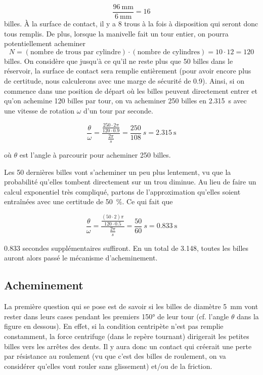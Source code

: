 \[\frac{\SI{96}{\milli\metre}}{\SI{6}{\milli\metre}} = \num{16}\]
billes. À la surface de contact, il y a \num{8} trous à la fois à disposition qui seront donc tous remplis. De plus, lorsque la manivelle fait un tour entier, on pourra potentiellement acheminer 
\[N = (\text{nombre de trous par cylindre}) \cdot (\text{nombre de cylindres}) = \num{10} \cdot \num{12} = \num{120}\]
billes.
On considère que jusqu'à ce qu'il ne reste plus que \num{50} billes dans le réservoir, la surface de contact sera remplie entièrement (pour avoir encore plus de certitude, nous calculerons avec une marge de sécurité de \num{0.9}).
Ainsi, si on commence dans une position de départ où les billes peuvent directement entrer et qu'on achemine \num{120} billes par tour, on va acheminer \num{250} billes en \SI{2.315}{\s} avec une vitesse de rotation $\omega$ d'un tour par seconde.

\[\frac{\theta}{\omega} = \frac{\frac{250 \cdot 2\pi}{120 \cdot 0.9}}{\frac{2\pi}{s}} = \frac{250}{108} \ s = \SI{2.315}{\s}\]

où $\theta$ est l'angle à parcourir pour acheminer 250 billes.

Les \num{50} dernières billes vont s'acheminer un peu plus lentement, vu que la probabilité qu'elles tombent directement sur un trou diminue. Au lieu de faire un calcul exponentiel très compliqué, partons de l'approximation qu'elles soient entraînées avec une certitude de \SI{50}{\percent}. Ce qui fait que

\[\frac{\theta}{\omega} = \frac{\frac{(50 \cdot 2)\pi}{120 \cdot 0.5}}{\frac{2 \pi}{s}} = \frac{50}{60} \ s = \SI{0.833}{\s}\]

0.833 secondes supplémentaires suffiront.
En un total de \SI{3.148}{\sec}, toutes les billes auront alors passé le mécanisme d'acheminement.


\subsection{Acheminement}
La première question qui se pose est de savoir si les billes de diamètre \SI{5}{\mm} vont rester dans leurs cases pendant les premiers \ang{150} de leur tour (cf. l'angle $\theta$ dans la figure en dessous). En effet, si la condition centripète n'est pas remplie constamment, la force centrifuge (dans le repère tournant) dirigerait les petites billes vers les arrêtes des dents. Il y aura donc un contact qui créerait une perte par résistance au roulement (vu que c'est des billes de roulement, on va considérer qu'elles vont rouler sans glissement) et/ou de la friction. 

